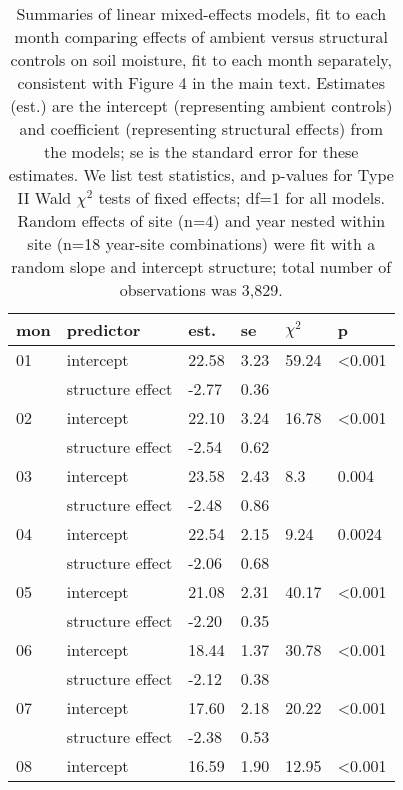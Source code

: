 \documentclass{article}
\begin{document}
\begin{table}[ht]
\centering
\caption{Summaries of linear mixed-effects models, fit to each month comparing effects of ambient versus structural controls on soil moisture, fit to each month separately, consistent with Figure 4 in the main text. Estimates (est.) are the intercept (representing ambient controls) and coefficient (representing structural effects) from the models; se is the standard error for these estimates. We list test statistics, and p-values for Type II Wald $\chi^{2}$ tests of fixed effects; df=1 for all models. Random effects of site (n=4) and year nested within site (n=18 year-site combinations) were fit with a random slope and intercept structure; total number of observations was 3,829.} 
\label{table:shamamb_soilmoism}
\begingroup\footnotesize
\begin{tabular}{|p{}|p{}|p{}p{}p{}p{}|}
  \hline
mon & predictor & est. & se & $\chi^2$ & p \\ 
  \hline
01 & intercept & 22.58 & 3.23 & 59.24 & <0.001 \\ 
    & structure effect & -2.77 & 0.36 &  &  \\ 
   \hline
02 & intercept & 22.10 & 3.24 & 16.78 & <0.001 \\ 
    & structure effect & -2.54 & 0.62 &  &  \\ 
   \hline
03 & intercept & 23.58 & 2.43 & 8.3 & 0.004 \\ 
    & structure effect & -2.48 & 0.86 &  &  \\ 
   \hline
04 & intercept & 22.54 & 2.15 & 9.24 & 0.0024 \\ 
    & structure effect & -2.06 & 0.68 &  &  \\ 
   \hline
05 & intercept & 21.08 & 2.31 & 40.17 & <0.001 \\ 
    & structure effect & -2.20 & 0.35 &  &  \\ 
   \hline
06 & intercept & 18.44 & 1.37 & 30.78 & <0.001 \\ 
    & structure effect & -2.12 & 0.38 &  &  \\ 
   \hline
07 & intercept & 17.60 & 2.18 & 20.22 & <0.001 \\ 
    & structure effect & -2.38 & 0.53 &  &  \\ 
   \hline
08 & intercept & 16.59 & 1.90 & 12.95 & <0.001 \\ 

\end{tabular}
\end{table}
\end{document}
